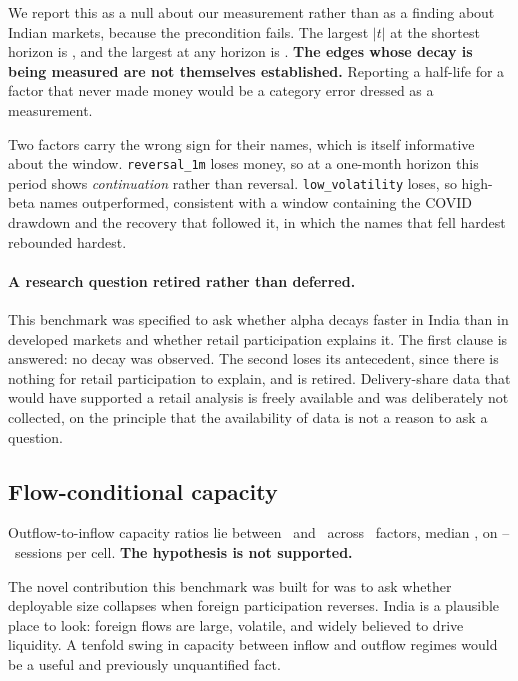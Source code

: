 \documentclass[11pt,a4paper]{article}
\begin{document}
We report this as a null about our measurement rather than as a finding about Indian markets,
because the precondition fails. The largest $|t|$ at the shortest horizon is
\fsDecayMaxAbsTstatShortest, and the largest at any horizon is \fsDecayMaxAbsTstat.
\textbf{The edges whose decay is being measured are not themselves established.} Reporting a
half-life for a factor that never made money would be a category error dressed as a measurement.

Two factors carry the wrong sign for their names, which is itself informative about the window.
\texttt{reversal\_1m} loses money, so at a one-month horizon this period shows \emph{continuation}
rather than reversal. \texttt{low\_volatility} loses, so high-beta names outperformed, consistent
with a window containing the COVID drawdown and the recovery that followed it, in which the names
that fell hardest rebounded hardest.

\paragraph{A research question retired rather than deferred.} This benchmark was specified to ask
whether alpha decays faster in India than in developed markets and whether retail participation
explains it. The first clause is answered: no decay was observed. The second loses its antecedent,
since there is nothing for retail participation to explain, and is retired. Delivery-share
data that would have supported a retail analysis is freely available and was deliberately not
collected, on the principle that the availability of data is not a reason to ask a question.

\subsection{Flow-conditional capacity}
\label{sec:flow}

\begin{finding}
Outflow-to-inflow capacity ratios lie between \fsFlowRatioMin\ and \fsFlowRatioMax\ across
\fsFlowNFactors\ factors, median \fsFlowRatioMedian, on
\fsFlowSessionsMin--\fsFlowSessionsMax\ sessions per cell. \textbf{The hypothesis is not supported.}
\end{finding}

The novel contribution this benchmark was built for was to ask whether deployable size collapses
when foreign participation reverses. India is a plausible place to look: foreign flows are large,
volatile, and widely believed to drive liquidity. A tenfold swing in capacity between inflow and
outflow regimes would be a useful and previously unquantified fact.
\end{document}
